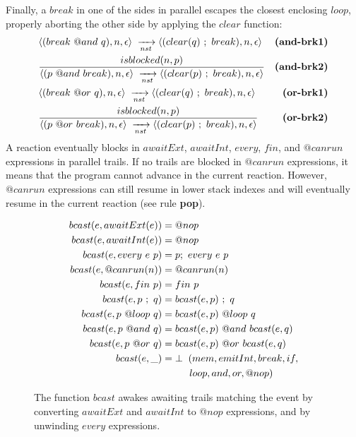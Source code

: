Finally, a $break$ in one of the sides in parallel escapes the closest 
enclosing $loop$, properly aborting the other side by applying the $clear$ 
function:
%
{ \setlength{\jot}{20pt}
\begin{eqnarray*}
& \LL (break~@and~q), n, \epsilon \RR \NST \LL (clear(q)~;~break),n,\epsilon \RR
    & \textbf{(and-brk1)}   \\
& \frac
    { \DS isblocked(n,p) }
    { \DS \LL (p~@and~break), n, \epsilon \RR \NST \LL (clear(p)~;~break),n,\epsilon \RR }
    & \textbf{(and-brk2)}   \\
& \LL (break~@or~q),n,\epsilon \RR \NST \LL (clear(q)~;~break),n,\epsilon \RR
    & \textbf{(or-brk1)}   \\
& \frac
    { \DS isblocked(n,p) }
    { \DS \LL (p~@or~break),n,\epsilon \RR \NST \LL (clear(p)~;~break),n,\epsilon \RR }
    & \textbf{(or-brk2)}   %
\end{eqnarray*}
}
%
A reaction eventually blocks in $awaitExt$, $awaitInt$, $every$, $fin$, and
$@canrun$ expressions in parallel trails.
%
If no trails are blocked in $@canrun$ expressions, it means that the program 
cannot advance in the current reaction.
%
However, $@canrun$ expressions can still resume in lower stack indexes and will
eventually resume in the current reaction (see rule \textbf{pop}).

\begin{figure}
{\small
\begin{align*}
  bcast(e, awaitExt(e)) &= @nop                         \\
  bcast(e, awaitInt(e)) &= @nop                         \\
  bcast(e, every~e~p)   &= p;~every~e~p                 \\
  bcast(e, @canrun(n))  &= @canrun(n)                   \\
  bcast(e, fin~p)       &= fin~p                        \\
  bcast(e, p~;~q)       &= bcast(e,p)~;~q               \\
  bcast(e, p~@loop~q)   &= bcast(e,p)~@loop~q           \\
  bcast(e, p~@and~q)    &= bcast(e,p)~@and~bcast(e,q)   \\
  bcast(e, p~@or~q)     &= bcast(e,p)~@or~bcast(e,q)    \\
  bcast(e, \_)          &= \bot \2 (mem,emitInt,break,if,  \\
                                 & \5\5 loop,and,or,@nop) %
\end{align*}
}
\caption{
The function $bcast$ awakes awaiting trails matching the event by converting
$awaitExt$ and $awaitInt$ to $@nop$ expressions, and by unwinding $every$
expressions.
\label{fig.bcast}
}
\end{figure}

